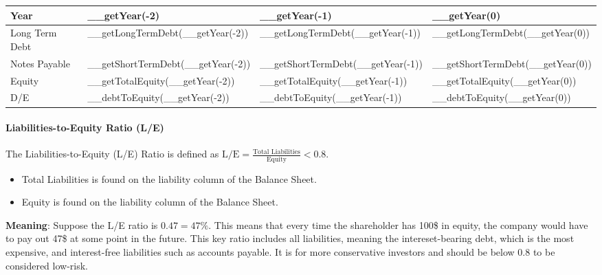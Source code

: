 \begin{tabularx}{\textwidth}{|X|X|X|X|}
 \hline
 Year                       & __getYear(-2)                        & __getYear(-1)                        & __getYear(0)                     \\
 \hline
 Long Term Debt             & __getLongTermDebt(__getYear(-2))     & __getLongTermDebt(__getYear(-1))     & __getLongTermDebt(__getYear(0))  \\
 Notes Payable              & __getShortTermDebt(__getYear(-2))    & __getShortTermDebt(__getYear(-1))    & __getShortTermDebt(__getYear(0)) \\
 Equity                     & __getTotalEquity(__getYear(-2))      & __getTotalEquity(__getYear(-1))      & __getTotalEquity(__getYear(0))   \\
 \rowcolor{lightgray} D/E   & __debtToEquity(__getYear(-2))        & __debtToEquity(__getYear(-1))        & __debtToEquity(__getYear(0))     \\
 \hline
\end{tabularx}

\paragraph{Liabilities-to-Equity Ratio (L/E)}

The Liabilities-to-Equity (L/E) Ratio is defined as
$\text{L/E} = \frac{\text{Total Liabilities}}{\text{Equity}} < 0.8$.
\begin{itemize}
    \item Total Liabilities is found on the liability column of the Balance Sheet.
    \item Equity is found on the liability column of the Balance Sheet.
\end{itemize}
\textbf{Meaning}: Suppose the L/E ratio is $0.47 = 47\%$. This means that every
time the shareholder has 100\$ in equity, the company would have to pay out 47\$
at some point in the future. This key ratio includes all liabilities, meaning the
intereset-bearing debt, which is the most expensive, and interest-free liabilities
such as accounts payable. It is for more conservative investors and should be
below 0.8 to be considered low-risk.\\

